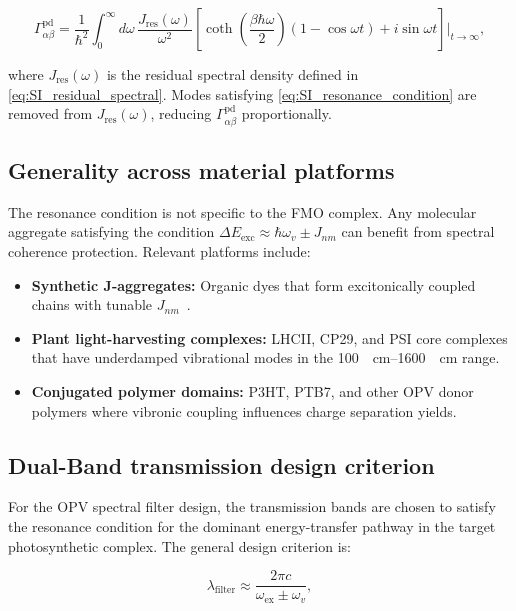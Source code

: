 \documentclass[11pt,a4paper]{article}
\begin{document}
\begin{equation}
\Gamma_{\alpha\beta}^{\mathrm{pd}} = \frac{1}{\hbar^2} \int_0^\infty d\omega\, \frac{J_{\mathrm{res}}(\omega)}{\omega^2} \left[\coth\!\left(\frac{\beta\hbar\omega}{2}\right)(1 - \cos\omega t) + i\sin\omega t\right]\bigg|_{t\to\infty},
\label{eq:SI_dephasing_rate}
\end{equation}

where $J_{\mathrm{res}}(\omega)$ is the residual spectral density defined in \cref{eq:SI_residual_spectral}.
Modes satisfying \cref{eq:SI_resonance_condition} are removed from $J_{\mathrm{res}}(\omega)$, reducing $\Gamma_{\alpha\beta}^{\mathrm{pd}}$ proportionally.

\subsection{Generality across material platforms}

The resonance condition is not specific to the FMO complex.
Any molecular aggregate satisfying the condition $\Delta E_{\mathrm{exc}} \approx \hbar\omega_v \pm J_{nm}$ can benefit from spectral coherence protection.
Relevant platforms include:

\begin{itemize}
\item \textbf{Synthetic J-aggregates:} Organic dyes that form excitonically coupled chains with tunable $J_{nm}$~\cite{Jang2008}.
\item \textbf{Plant light-harvesting complexes:} LHCII, CP29, and PSI core complexes that have underdamped vibrational modes in the \qtyrange{100}{1600}{\per\cm} range.
\item \textbf{Conjugated polymer domains:} P3HT, PTB7, and other OPV donor polymers where vibronic coupling influences charge separation yields.
\end{itemize}

\subsection{Dual-Band transmission design criterion}

For the OPV spectral filter design, the transmission bands are chosen to satisfy the resonance condition for the dominant energy-transfer pathway in the target photosynthetic complex.
The general design criterion is:

\begin{equation}
\lambda_{\mathrm{filter}} \approx \frac{2\pi c}{\omega_{\mathrm{ex}} \pm \omega_v},
\label{eq:SI_filter_design}
\end{equation}
\end{document}
